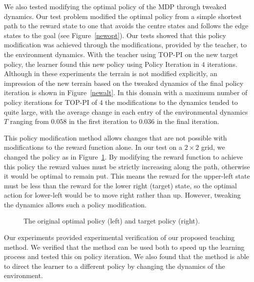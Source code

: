 We also tested modifying the optimal policy of the MDP through tweaked dynamics.  Our test problem modified the optimal policy from a simple shortest path to the reward state to one that avoids the centre states and follows the edge states to the goal (see Figure~\ref{newopt}).  Our tests showed that this policy modification was achieved through the modifications, provided by the teacher, to the environment dynamics.   With the teacher using TOP-PI on the new target policy, the learner found this new policy using Policy Iteration in $4$ iterations.  Although in these experiments the terrain is not modified explicitly, an impression of the new terrain based on the tweaked dynamics of the final policy iteration is shown in Figure~\ref{newalt}.  In this domain with a maximum number of policy iterations for TOP-PI of $4$ the modifications to the dynamics tended to quite large, with the average change in each entry of the environmental dynamics $T$ ranging from $0.058$ in the first iteration to $0.036$ in the final iteration.

This policy modification method allows changes that are not possible with modifications to the reward function alone.  In our test on a $2 \times 2$ grid, we changed the policy as in Figure~\ref{envdopt}.  By modifying the reward function to achieve this policy the reward values must be strictly increasing along the path, otherwise it would be optimal to remain put.  This means the reward for the upper-left state must be less than the reward for the lower right (target) state, so the optimal action for lower-left would be to move right rather than up.  However, tweaking the dynamics allows such a policy modification.

\begin{figure}[ht]
\centerline{}
\caption{\label{envdopt}The original optimal policy (left) and target policy (right).}
\end{figure}

Our experiments provided experimental verification of our proposed teaching method.  We verified that the method can be used both to speed up the learning process and tested this on policy iteration.  We also found that the method is able to direct the learner to a different policy by changing the dynamics of the environment.
